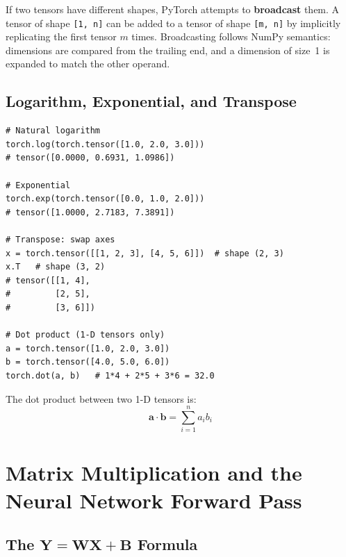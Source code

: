\documentclass[12pt,a4paper]{article}
\newcommand{\tbf}[1]{\textbf{#1}}
\newcommand{\ttt}[1]{\texttt{#1}}
\begin{document}
\begin{example}[title=Broadcasting Rules]
If two tensors have different shapes, PyTorch attempts to \tbf{broadcast}
them. A tensor of shape \ttt{[1, n]} can be added to a tensor of shape
\ttt{[m, n]} by implicitly replicating the first tensor $m$ times. Broadcasting
follows NumPy semantics: dimensions are compared from the trailing end, and a
dimension of size~1 is expanded to match the other operand.
\end{example}

\subsection{Logarithm, Exponential, and Transpose}
\label{subsec:log-exp}

\begin{lstlisting}[caption={\ttt{torch.log}, \ttt{torch.exp}, transpose, dot
                   product (V15, 01:02:46).}, label={lst:log-exp}]
# Natural logarithm
torch.log(torch.tensor([1.0, 2.0, 3.0]))
# tensor([0.0000, 0.6931, 1.0986])

# Exponential
torch.exp(torch.tensor([0.0, 1.0, 2.0]))
# tensor([1.0000, 2.7183, 7.3891])

# Transpose: swap axes
x = torch.tensor([[1, 2, 3], [4, 5, 6]])  # shape (2, 3)
x.T   # shape (3, 2)
# tensor([[1, 4],
#         [2, 5],
#         [3, 6]])

# Dot product (1-D tensors only)
a = torch.tensor([1.0, 2.0, 3.0])
b = torch.tensor([4.0, 5.0, 6.0])
torch.dot(a, b)   # 1*4 + 2*5 + 3*6 = 32.0
\end{lstlisting}

The dot product between two 1-D tensors is:
\begin{equation}
  \label{eq:dot}
  \mathbf{a} \cdot \mathbf{b} = \sum_{i=1}^{n} a_i b_i
\end{equation}

\section{Matrix Multiplication and the Neural Network Forward Pass}
\label{sec:matmul}

\subsection{The \texorpdfstring{$\mathbf{Y} = \mathbf{W}\mathbf{X} + \mathbf{B}$}{Y = WX + B} Formula}
\label{subsec:wxb}
\end{document}
